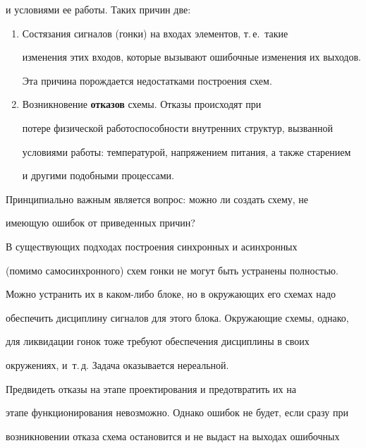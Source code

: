и условиями ее работы. Таких причин две:


      \begin{enumerate}[1.]


      \item  Состязания сигналов (гонки) на входах элементов, т.\,е.\ такие 


изменения этих входов, которые вызывают ошибочные изменения их выходов. 


Эта причина порождается недостатками построения схем. %


      \item  Возникновение \textbf{отказов} схемы. Отказы происходят при 


потере физической работоспособности внутренних структур, вызванной 


условиями работы: температурой, напряжением питания, а также старением 


и другими подобными процессами.


      \end{enumerate}


      


      Принципиально важным является вопрос: можно ли создать схему, не 


имеющую ошибок от приведенных причин?


      


      В существующих подходах построения синхронных и асинхронных 


(помимо самосинхронного) схем гонки не могут быть устранены полностью. 


Можно устранить их в каком-либо блоке, но в окружающих его схемах надо 


обеспечить дисциплину сигналов для этого блока. Окружающие схемы, однако, 


для ликвидации гонок тоже требуют обеспечения дисциплины в своих 


окружениях, и~т.\,д. Задача оказывается нереальной.


      


      Предвидеть отказы на этапе проектирования и предотвратить их на 


этапе функционирования невозможно. Однако ошибок не будет, если сразу при 


возникновении отказа схема остановится и не выдаст на выходах ошибочных 


